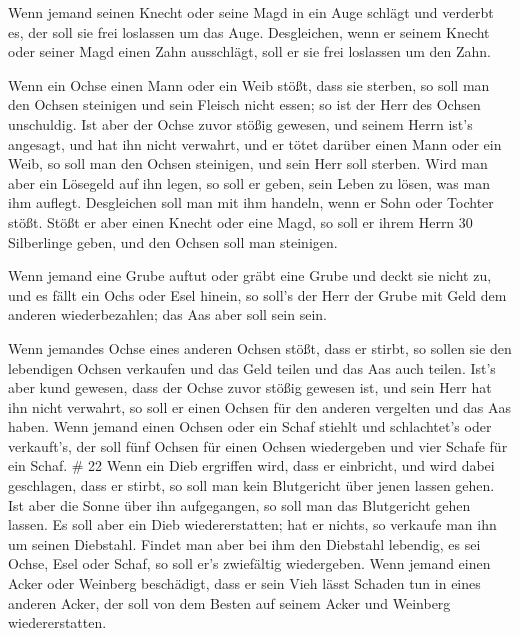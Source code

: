  Wenn jemand seinen Knecht oder seine Magd in ein Auge
schlägt und verderbt es, der soll sie frei loslassen um das Auge.
 Desgleichen, wenn er seinem Knecht oder seiner Magd einen
Zahn ausschlägt, soll er sie frei loslassen um den Zahn.

 Wenn ein Ochse einen Mann oder ein Weib stößt, dass sie
sterben, so soll man den Ochsen steinigen und sein Fleisch nicht essen;
so ist der Herr des Ochsen unschuldig.  Ist aber der Ochse
zuvor stößig gewesen, und seinem Herrn ist's angesagt, und hat ihn nicht
verwahrt, und er tötet darüber einen Mann oder ein Weib, so soll man den
Ochsen steinigen, und sein Herr soll sterben.  Wird man
aber ein Lösegeld auf ihn legen, so soll er geben, sein Leben zu lösen,
was man ihm auflegt.  Desgleichen soll man mit ihm handeln,
wenn er Sohn oder Tochter stößt.  Stößt er aber einen
Knecht oder eine Magd, so soll er ihrem Herrn 30 Silberlinge geben, und
den Ochsen soll man steinigen.

 Wenn jemand eine Grube auftut oder gräbt eine Grube und
deckt sie nicht zu, und es fällt ein Ochs oder Esel hinein,
 so soll's der Herr der Grube mit Geld dem anderen
wiederbezahlen; das Aas aber soll sein sein.

 Wenn jemandes Ochse eines anderen Ochsen stößt, dass er
stirbt, so sollen sie den lebendigen Ochsen verkaufen und das Geld
teilen und das Aas auch teilen.  Ist's aber kund gewesen,
dass der Ochse zuvor stößig gewesen ist, und sein Herr hat ihn nicht
verwahrt, so soll er einen Ochsen für den anderen vergelten und das Aas
haben.  Wenn jemand einen Ochsen oder ein Schaf stiehlt und
schlachtet's oder verkauft's, der soll fünf Ochsen für einen Ochsen
wiedergeben und vier Schafe für ein Schaf. \# 22  Wenn ein
Dieb ergriffen wird, dass er einbricht, und wird dabei geschlagen, dass
er stirbt, so soll man kein Blutgericht über jenen lassen gehen.
 Ist aber die Sonne über ihn aufgegangen, so soll man das
Blutgericht gehen lassen. Es soll aber ein Dieb wiedererstatten; hat er
nichts, so verkaufe man ihn um seinen Diebstahl.  Findet man
aber bei ihm den Diebstahl lebendig, es sei Ochse, Esel oder Schaf, so
soll er's zwiefältig wiedergeben.  Wenn jemand einen Acker
oder Weinberg beschädigt, dass er sein Vieh lässt Schaden tun in eines
anderen Acker, der soll von dem Besten auf seinem Acker und Weinberg
wiedererstatten.

